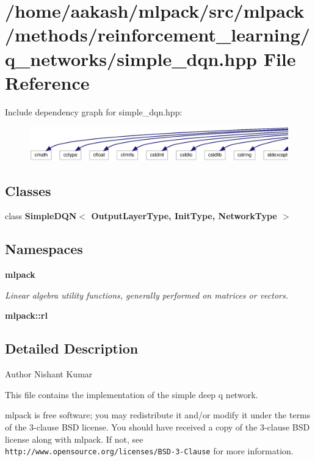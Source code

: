 \section{/home/aakash/mlpack/src/mlpack/methods/reinforcement\+\_\+learning/q\+\_\+networks/simple\+\_\+dqn.hpp File Reference}
\label{simple__dqn_8hpp}
Include dependency graph for simple\+\_\+dqn.\+hpp\+:
\nopagebreak
\begin{figure}[H]
\begin{center}
\leavevmode
\includegraphics[width=350pt]{simple__dqn_8hpp__incl}
\end{center}
\end{figure}
\subsection*{Classes}
\begin{DoxyCompactItemize}
\item 
class \textbf{ Simple\+D\+Q\+N$<$ Output\+Layer\+Type, Init\+Type, Network\+Type $>$}
\end{DoxyCompactItemize}
\subsection*{Namespaces}
\begin{DoxyCompactItemize}
\item 
 \textbf{ mlpack}
\begin{DoxyCompactList}\small\item\em Linear algebra utility functions, generally performed on matrices or vectors. \end{DoxyCompactList}\item 
 \textbf{ mlpack\+::rl}
\end{DoxyCompactItemize}


\subsection{Detailed Description}
\begin{DoxyAuthor}{Author}
Nishant Kumar
\end{DoxyAuthor}
This file contains the implementation of the simple deep q network.

mlpack is free software; you may redistribute it and/or modify it under the terms of the 3-\/clause B\+SD license. You should have received a copy of the 3-\/clause B\+SD license along with mlpack. If not, see {\tt http\+://www.\+opensource.\+org/licenses/\+B\+S\+D-\/3-\/\+Clause} for more information. 